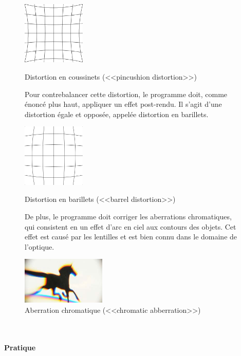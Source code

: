 \documentclass[a4paper,french,12pt]{article}
\begin{document}
			     \begin{figure}[h!]
			      \centering
				\includegraphics[width=3cm]{pincushion_distortion.png}
			      \caption{Distortion en coussinets (<<pincushion distortion>>)}\par\medskip
			    

			    Pour contrebalancer cette distortion, le programme doit, comme énoncé plus haut, appliquer
			    un effet post-rendu. Il s'agit d'une distortion égale et opposée, appelée distortion en 
			    barillets.\par\bigskip
			    
			     {
			      \centering
				\includegraphics[width=3cm]{barrel_distortion.png}
			      \caption{Distortion en barillets (<<barrel distortion>>)}
			     }\par\medskip
			    
			    De plus, le programme doit corriger les aberrations chromatiques, qui consistent en un effet
			    d'arc en ciel aux contours des objets. Cet effet est causé par les lentilles et est
			    bien connu dans le domaine de l'optique.\par\bigskip
			    
			   {
			      \centering
				\includegraphics[width=4cm]{chromatic_aberration.jpg}
			      \caption{Aberration chromatique (<<chromatic abberration>>)}
			   }
			    \end{figure}  ~ \\
			    
			    
			\paragraph{Pratique} ~\\
			
\end{document}
